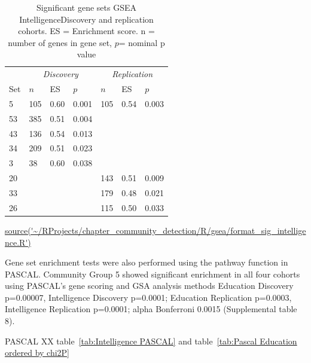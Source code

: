 \begin{table}[ht!]
\centering
\setlength{\extrarowheight}{2pt}
\begin{tabular}{lllllll}
  \toprule
   &  \multicolumn{3}{c}{\textit{Discovery}} & \multicolumn{3}{c}{\textit{Replication}} \\
   \cmidrule{2-7}
Set & $n$ & ES & $p$ & $n$ & ES & $p$ \\ 
  \midrule
5 & 105 & 0.60 & 0.001 & 105 & 0.54 & 0.003 \\ 
  53 & 385 & 0.51 & 0.004 &  &  &  \\ 
  43 & 136 & 0.54 & 0.013 &  &  &  \\ 
  34 & 209 & 0.51 & 0.023 &  &  &  \\ 
  3 & 38 & 0.60 & 0.038 &  &  &  \\ 
  20 &  &  &  & 143 & 0.51 & 0.009 \\ 
  33 &  &  &  & 179 & 0.48 & 0.021 \\ 
  26 &  &  &  & 115 & 0.50 & 0.033 \\ 
   \bottomrule
\end{tabular}
\caption{Significant gene sets GSEA IntelligenceDiscovery and replication cohorts.  ES = Enrichment score. n = number of genes in gene set, $p$= nominal p value}
\tiny\url{source('~/RProjects/chapter_community_detection/R/gsea/format_sig_intelligence.R')}
\label{tab:Significant gene sets GSEA Intelligence}
\end{table}

Gene set enrichment tests were also performed using the pathway function in PASCAL.\cite{lamparter2016fast} Community Group 5 showed significant enrichment in all four cohorts using PASCAL’s gene scoring and GSA analysis methods Education Discovery p=0.00007, Intelligence Discovery p=0.0001; Education Replication p=0.0003, Intelligence Replication p=0.0001; alpha Bonferroni 0.0015 (Supplemental table 8). 

PASCAL XX table~\ref{tab:Intelligence PASCAL} and table~\ref{tab:Pascal Education ordered by chi2P}


